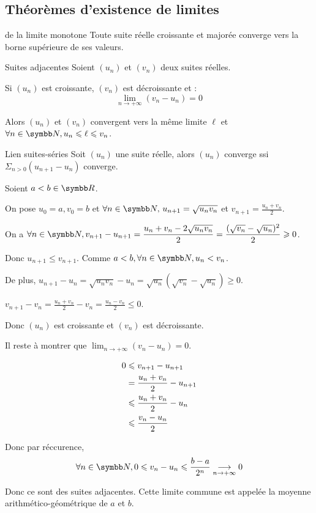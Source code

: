 \subsection{Théorèmes d'existence de limites}

\begin{theoreme}{de la limite monotone}{}
    Toute suite réelle croissante et majorée converge vers la borne supérieure de ses valeurs. 
\end{theoreme}

\begin{theoreme}{Suites adjacentes}{}
    Soient $(u_n)$ et $(v_n)$ deux suites réelles. 

    Si $(u_n)$ est croissante, $(v_n)$ est décroissante et :
    \[\lim_{n \to +\infty} (v_n - u_n) = 0\]

    Alors $(u_n)$ et $(v_n)$ convergent vers la même limite $\ell$ 
    et $\forall n \in \N, u_n \leqslant \ell \leqslant v_n$.
\end{theoreme}

\begin{theoreme}{Lien suites-séries}{}
    Soit $(u_n)$ une suite réelle, alors $(u_n)$ converge ssi $\Sigma_{n>0} (u_{n+1} - u_n)$ converge.
\end{theoreme}

\begin{exemple}
    Soient $a < b \in \R$.

    On pose $u_0 = a, v_0 = b$ 
    et $\forall n \in \N, \, u_{n+1} = \sqrt{u_n v_n}$ et $v_{n+1} = \frac{u_n + v_n} 2$.
 
    \svspace On a $\displaystyle \forall n \in \N, v_{n+1} - u_{n+1} = \frac{u_n + v_n -2 \sqrt{u_n v_n}} 2 = \frac{(\sqrt{v_n} - \sqrt{u_n})^2} 2 \geqslant 0$.

    Donc $u_{n + 1} \leqslant v_{n + 1}$.
    Comme $a < b, \forall n \in \N, u_n < v_n$.

    \avspace De plus, $u_{n + 1} - u_n = \sqrt{u_n v_n} - u_n = \sqrt{u_n}\left(\sqrt{v_n} - \sqrt{u_n}\right) \geqslant 0$.

    $v_{n + 1} - v_n = \frac{u_n + v_n} 2 - v_n = \frac{u_n - v_n} 2 \leqslant 0$.

    Donc $(u_n)$ est croissante et $(v_n)$ est décroissante.

    Il reste à montrer que $\lim_{n \to +\infty} (v_n - u_n) = 0$.

    \begin{align}
        0 & \leqslant  v_{n + 1} - u_{n + 1} \\
        \space & = \frac{u_n + v_n} 2 - u_{n + 1} \\
        \space &  \leqslant \frac{u_n + v_n} 2 - u_n \\
        \space & \leqslant \frac{v_n - u_n} 2 \\
    \end{align}
    
    Donc par réccurence, 
    \[\forall n \in \N, 0 \leqslant v_n - u_n \leqslant \frac{b - a}{2^n} \limit{n}{+ \infty} 0\]

    Donc ce sont des suites adjacentes.
    Cette limite commune est appelée la moyenne arithmético-géométrique de $a$ et $b$.
\end{exemple}

